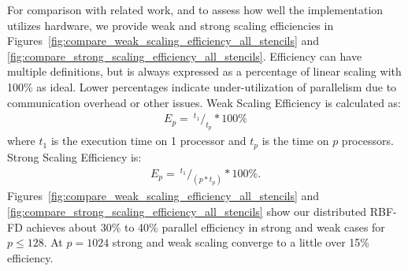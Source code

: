 \documentclass{report}
\begin{document}
For comparison with related work, and to assess how well the implementation utilizes hardware, we provide weak and strong scaling efficiencies in Figures~\ref{fig:compare_weak_scaling_efficiency_all_stencils} and \ref{fig:compare_strong_scaling_efficiency_all_stencils}. Efficiency can have multiple definitions, but is always expressed as a percentage of linear scaling with 100\% as ideal. Lower percentages indicate under-utilization of parallelism due to communication overhead or other issues.  Weak Scaling Efficiency is calculated as: 
\begin{align*}
E_p = \ ^{t_1}/_{t_p} * 100\%
\end{align*}
where $t_1$ is the execution time on 1 processor and $t_p$ is the time on $p$ processors.
Strong Scaling Efficiency is: 
\begin{align*}
E_p = \ ^{t_{1}}/_{(p*t_p)} * 100\%.
\end{align*}
Figures~\ref{fig:compare_weak_scaling_efficiency_all_stencils} and \ref{fig:compare_strong_scaling_efficiency_all_stencils} show our distributed RBF-FD achieves about 30\% to 40\% parallel efficiency in strong and weak cases for $p \leq 128$. At $p=1024$ strong and weak scaling converge to a little over 15\% efficiency. 

\end{document}
